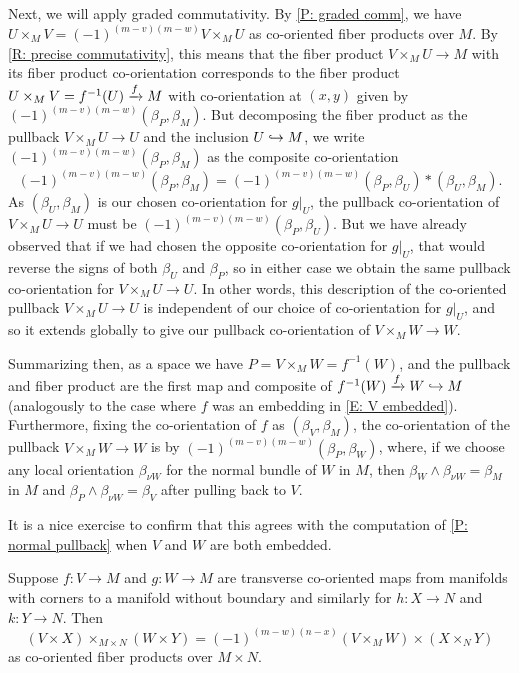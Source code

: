 \begin{example}
	Next, we will apply graded commutativity.
	By \cref{P: graded comm}, we have $U \times_M V = (-1)^{(m-v)(m-w)}V \times_M U$ as co-oriented fiber products over $M$.
	By \cref{R: precise commutativity}, this means that the fiber product $V \times_M U \to M$ with its fiber product co-orientation corresponds to the fiber product $U \times_M V = f^{-1}(U) \xrightarrow{f} M$ with co-orientation at $(x,y)$ given by $(-1)^{(m-v)(m-w)}(\beta_P, \beta_M)$.
	But decomposing the fiber product as the pullback $V \times_M U \to U$ and the inclusion $U \hookrightarrow M$, we write $(-1)^{(m-v)(m-w)}(\beta_P, \beta_M)$ as the composite co-orientation
	$$(-1)^{(m-v)(m-w)}(\beta_P, \beta_M) = (-1)^{(m-v)(m-w)}(\beta_P, \beta_U)*(\beta_U, \beta_M).$$
	As $(\beta_U, \beta_M)$ is our chosen co-orientation for $g|_U$, the pullback co-orientation of $V \times_M U \to U$ must be $(-1)^{(m-v)(m-w)}(\beta_P, \beta_U)$.
	But we have already observed that if we had chosen the opposite co-orientation for $g|_U$, that would reverse the signs of both $\beta_U$ and $\beta_P$, so in either case we obtain the same pullback co-orientation for $V \times_M U \to U$.
	In other words, this description of the co-oriented pullback $V \times_M U \to U$ is independent of our choice of co-orientation for $g|_U$, and so it extends globally to give our pullback co-orientation of $V \times_M W \to W$.

	Summarizing then, as a space we have $P = V \times_M W = f^{-1}(W)$, and the pullback and fiber product are the first map and composite of $f^{-1}(W) \xrightarrow{f} W \hookrightarrow M$ (analogously to the case where $f$ was an embedding in \cref{E: V embedded}).
	Furthermore, fixing the co-orientation of $f$ as $(\beta_V, \beta_M)$, the co-orientation of the pullback $V \times_M W \to W$ is by $(-1)^{(m-v)(m-w)}(\beta_P, \beta_W)$, where, if we choose any local orientation $\beta_{\nu W}$ for the normal bundle of $W$ in $M$, then $\beta_W \wedge \beta_{\nu W} = \beta_M$ in $M$ and $\beta_P \wedge \beta_{\nu W} = \beta_V$ after pulling back to $V$.

	It is a nice exercise to confirm that this agrees with the computation of \cref{P: normal pullback} when $V$ and $W$ are both embedded.
\end{example}


\begin{corollary}\label{C: criss cross}
	Suppose $f \colon V \to M$ and $g \colon W \to M$ are transverse co-oriented maps from manifolds with corners to a manifold without boundary and similarly for $h \colon X \to N$ and $k \colon Y \to N$.
	Then$$(V \times X)\times_{M \times N} (W \times Y) = (-1)^{(m-w)(n-x)} (V \times_M W) \times (X \times_N Y) $$
	as co-oriented fiber products over $M \times N$.
\end{corollary}

